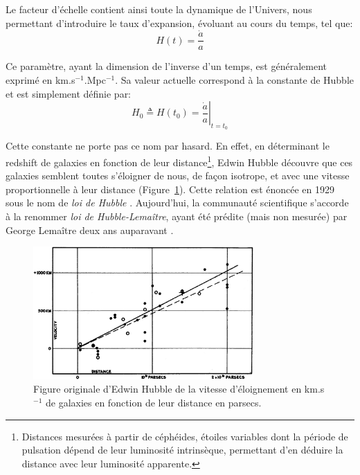 \documentclass[../main/main.tex]{subfiles}
\begin{document}
Le facteur d'échelle contient ainsi toute la dynamique de l'Univers,
nous permettant d'introduire le taux d'expansion, évoluant au cours du
temps, tel que:
\begin{equation}
  \label{eq:hubble}
  H(t)=\frac{\dot{a}}{a}
\end{equation}

Ce paramètre, ayant la dimension de l'inverse d'un temps, est
généralement exprimé en km.s$^{-1}$.Mpc$^{-1}$. Sa valeur actuelle
correspond à la constante de Hubble et est simplement définie par:
\begin{equation}
  \label{eq:hubbleconstante}
  H_{0}\triangleq H(t_{0}) = \left.\frac{\dot{a}}{a}\right\vert_{t=t_{0}}
\end{equation}

Cette constante ne porte pas ce nom par hasard. En effet, en déterminant
le redshift de galaxies en fonction de leur distance\footnote{Distances
  mesurées à partir de céphéides, étoiles variables dont la période de
  pulsation dépend de leur luminosité intrinsèque, permettant d'en
  déduire la distance avec leur luminosité apparente.}, Edwin Hubble
découvre que ces galaxies semblent toutes s'éloigner de nous, de façon
isotrope, et avec une vitesse proportionnelle à leur distance (Figure~\ref{fig:hubble}). Cette
relation est énoncée en 1929 sous le nom de \textit{loi de Hubble}
\citep{Hubble1929}. Aujourd'hui, la communauté scientifique s'accorde à
la renommer \textit{loi de Hubble-Lemaître}, ayant été prédite (mais non
mesurée) par George Lemaître deux ans auparavant
\citep{Lemaitre1927}.

\begin{figure}[ht]
  \centering
  \includegraphics[width=0.75\textwidth]{../figures/01_cosmology/Hubble.jpg}
  \caption[Figure originale d'Edwin Hubble de la vitesse d'éloignement
  de galaxies en fonction de leur distance.]{Figure originale d'Edwin
    Hubble \citep{Hubble1929} de la vitesse d'éloignement en km.s$^{-1}$
  de galaxies en fonction de leur distance en parsecs.}
\label{fig:hubble}
\end{figure}
\end{document}

